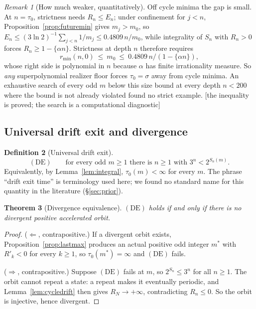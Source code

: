\documentclass[11pt]{article}
\theoremstyle{plain}
\newtheorem{theorem}{Theorem}[section]
\theoremstyle{definition}
\newtheorem{definition}[theorem]{Definition}
\theoremstyle{remark}
\newtheorem{remark}[theorem]{Remark}
\newcommand{\al}{\alpha}
\newcommand{\rmin}{r_{\min}}
\newcommand{\status}[1]{\textsf{\footnotesize[#1]}}
\begin{document}
\begin{remark}[How much weaker, quantitatively]\label{rem:howweak}
Off cycle minima the gap is small. At $n=\tau_0$, strictness needs $R_n\le E_n$; under confinement
for $j<n$, Proposition~\ref{prop:futuremin} gives $m_j>m_0$, so
$E_n\le(3\ln2)^{-1}\sum_{j<n}1/m_j\le 0.4809\,n/m_0$, while integrality of $S_n$ with $R_n>0$
forces $R_n\ge1-\{\al n\}$. Strictness at depth $n$ therefore requires
\[
\rmin(n,0)\ \le\ m_0\ \le\ 0.4809\,n/(1-\{\al n\}),
\]
whose right side is polynomial in $n$ because $\al$ has finite irrationality measure. So
\emph{any} superpolynomial realizer floor forces $\tau_0=\sigma$ away from cycle minima.
An exhaustive search of every odd $m$ below this size bound at every depth $n<200$ where the bound
is not already violated found no strict example. \status{the inequality is proved; the search is a
computational diagnostic}
\end{remark}

\subsection{Universal drift exit and divergence}\label{sec:DE}

\begin{definition}[Universal drift exit]
\[
(\mathrm{DE})\qquad\text{for every odd }m\ge1\text{ there is }n\ge1\text{ with } 3^n<2^{S_n(m)} .
\]
Equivalently, by Lemma~\ref{lem:integral}, $\tau_0(m)<\infty$ for every $m$. The phrase ``drift
exit time'' is terminology used here; we found no standard name for this quantity in the
literature (\S\ref{sec:prior}).
\end{definition}

\begin{theorem}[Divergence equivalence]\label{thm:DEequiv}
$(\mathrm{DE})$ holds if and only if there is no divergent positive accelerated orbit.
\end{theorem}

\begin{proof}
($\Leftarrow$, contrapositive.) If a divergent orbit exists, Proposition~\ref{prop:lastmax}
produces an actual positive odd integer $m^*$ with $R'_k<0$ for every $k\ge1$, so
$\tau_0(m^*)=\infty$ and $(\mathrm{DE})$ fails.

($\Rightarrow$, contrapositive.) Suppose $(\mathrm{DE})$ fails at $m$, so $2^{S_n}\le3^n$ for all
$n\ge1$. The orbit cannot repeat a state: a repeat makes it eventually periodic, and
Lemma~\ref{lem:cycledrift} then gives $R_N\to+\infty$, contradicting $R_n\le0$. So the orbit is
injective, hence divergent.
\end{proof}
\end{document}
